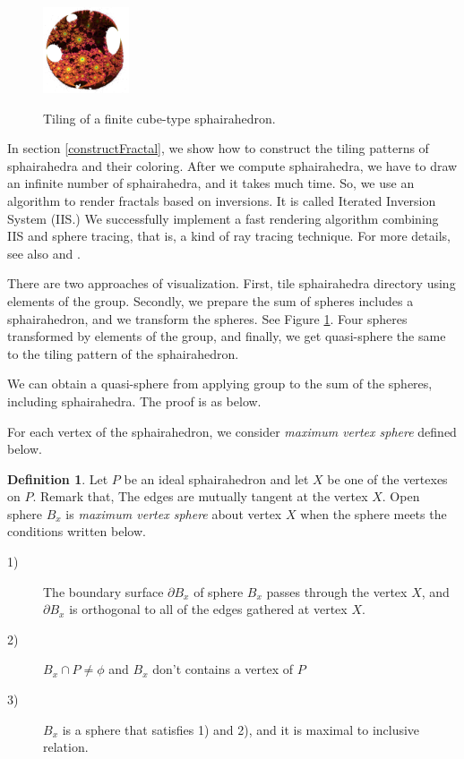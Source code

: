 \documentclass[suppldata, dvipdfmx]{interact}
\theoremstyle{plain}%
\theoremstyle{definition}
\newtheorem{definition}[theorem]{Definition}
\theoremstyle{remark}
\theoremstyle{problemstyle}
\begin{document}
\begin{figure}[H]
 \hspace*{\fill}
 \begin{minipage}[t]{0.18\textwidth}
  \centering
  \includegraphics[width=1in, height=1in, keepaspectratio]{./img/visualization/sphereFinal.jpg}
  \label{fig:visualizeSpheresFinal}
 \end{minipage}
 \hspace*{\fill}
 \caption{Tiling of a finite cube-type sphairahedron.}
 \label{fig:visualizeSpheres}
\end{figure}

In section \ref{constructFractal}, we show how to construct the tiling
patterns of sphairahedra and their coloring.
After we compute sphairahedra, we have to draw an infinite number of
sphairahedra, and it takes much time.
So, we use an algorithm to render fractals based on
inversions. It is called Iterated Inversion System (IIS.)
We successfully implement a fast rendering algorithm
combining IIS and sphere tracing, that is, a kind of ray tracing technique.
For more details, see also \cite{bridges2017} and \cite{bridges2018}.

There are two approaches of visualization.
First, tile sphairahedra directory using elements of the group.
Secondly, we prepare the sum of spheres includes a sphairahedron, and we
transform the spheres.
See Figure \ref{fig:visualizeSpheres}.
Four spheres transformed by elements of the group, and finally, we get
quasi-sphere the same to the tiling pattern of the sphairahedron.

We can obtain a quasi-sphere from applying group to the sum of the spheres,
including sphairahedra. The proof is as below.

For each vertex of the sphairahedron, we consider \textit{maximum vertex
sphere} defined below.

\begin{definition}
 Let $P$ be an ideal sphairahedron and let $X$ be one of the vertexes on $P$.
 Remark that, The edges are mutually tangent at the vertex $X$.
 Open sphere $B_x$ is \textit{maximum vertex sphere} about vertex $X$ when the sphere
 meets the conditions written below.

 \begin{description}
  \item[1)] The boundary surface $\partial B_x$ of sphere $B_x$ passes through
             the vertex $X$, and $\partial B_x$ is orthogonal to all of the
             edges gathered at vertex $X$.
  \item[2)] $B_x \cap P \neq \phi$ and $B_x$ don't contains a vertex of
             $P$
  \item[3)] $B_x$ is a sphere that satisfies 1) and 2), and it is
             maximal to inclusive relation.
 \end{description}
\end{definition}
\end{document}
